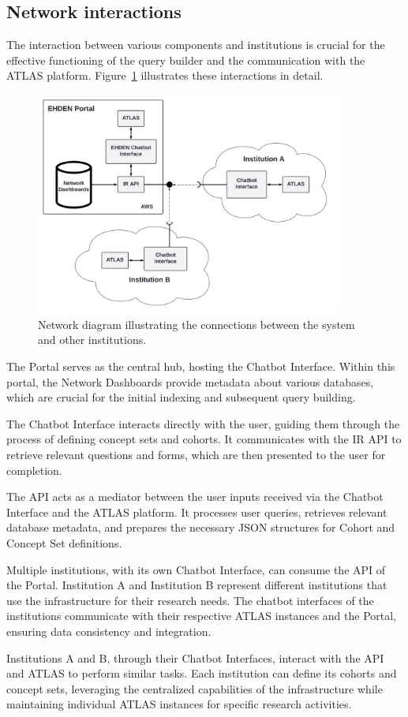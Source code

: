 \subsection{Network interactions}

The interaction between various components and institutions is crucial for the effective functioning of the query builder and the communication with the ATLAS platform. Figure~\ref{fig_network} illustrates these interactions in detail.

\begin{figure}[H]
  \includegraphics[width=0.9\textwidth]{figs/chapter4/network_diagram.png}
  \centering
  \caption[Network diagram between components]{Network diagram illustrating the connections between the system and other institutions.}
  \label{fig_network}
\end{figure}

The {\ehden} Portal serves as the central hub, hosting the {\ehden} Chatbot Interface. Within this portal, the Network Dashboards provide metadata about various databases, which are crucial for the initial indexing and subsequent query building.

The {\ehden} Chatbot Interface interacts directly with the user, guiding them through the process of defining concept sets and cohorts. It communicates with the IR API to retrieve relevant questions and forms, which are then presented to the user for completion.

The {\ir} API acts as a mediator between the user inputs received via the Chatbot Interface and the ATLAS platform. It processes user queries, retrieves relevant database metadata, and prepares the necessary JSON structures for Cohort and Concept Set definitions.

Multiple institutions, with its own Chatbot Interface, can consume the {\ir} API of the {\ehden} Portal. Institution A and Institution B represent different institutions that use the {\ehden} infrastructure for their research needs. The chatbot interfaces of the institutions communicate with their respective ATLAS instances and the {\ehden} Portal, ensuring data consistency and integration.

Institutions A and B, through their Chatbot Interfaces, interact with the {\ir} API and ATLAS to perform similar tasks. Each institution can define its cohorts and concept sets, leveraging the centralized capabilities of the {\ehden} infrastructure while maintaining individual ATLAS instances for specific research activities.

